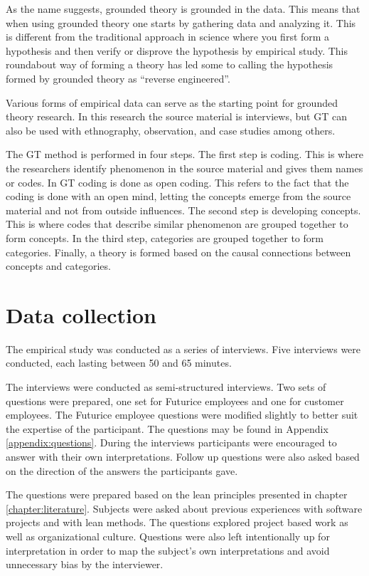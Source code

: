 As the name suggests, grounded theory is grounded in the data. This means that when using grounded theory one starts by gathering data and analyzing it. This is different from the traditional approach in science where you first form a hypothesis and then verify or disprove the hypothesis by empirical study. This roundabout way of forming a theory has led some to calling the hypothesis formed by grounded theory as ``reverse engineered''. \cite{lazar2010research}

Various forms of empirical data can serve as the starting point for grounded theory research. In this research the source material is interviews, but GT can also be used with ethnography, observation, and case studies among others. \cite{lazar2010research}

The GT method is performed in four steps. The first step is coding. This is where the researchers identify phenomenon in the source material and gives them names or codes. In GT coding is done as open coding. This refers to the fact that the coding is done with an open mind, letting the concepts emerge from the source material and not from outside influences. The second step is developing concepts. This is where codes that describe similar phenomenon are grouped together to form concepts. In the third step, categories are grouped together to form categories. Finally, a theory is formed based on the causal connections between concepts and categories. \cite{lazar2010research}


\section{Data collection}
\label{section:methoddata}


The empirical study was conducted as a series of interviews. Five interviews were conducted, each lasting between 50 and 65 minutes.

The interviews were conducted as semi-structured interviews. Two sets of questions were prepared, one set for Futurice employees and one for customer employees. The Futurice employee questions were modified slightly to better suit the expertise of the participant. The questions may be found in Appendix \ref{appendix:questions}. During the interviews participants were encouraged to answer with their own interpretations. Follow up questions were also asked based on the direction of the answers the participants gave.

The questions were prepared based on the lean principles presented in chapter \ref{chapter:literature}. Subjects were asked about previous experiences with software projects and with lean methods. The questions explored project based work as well as organizational culture. Questions were also left intentionally up for interpretation in order to map the subject's own interpretations and avoid unnecessary bias by the interviewer.


